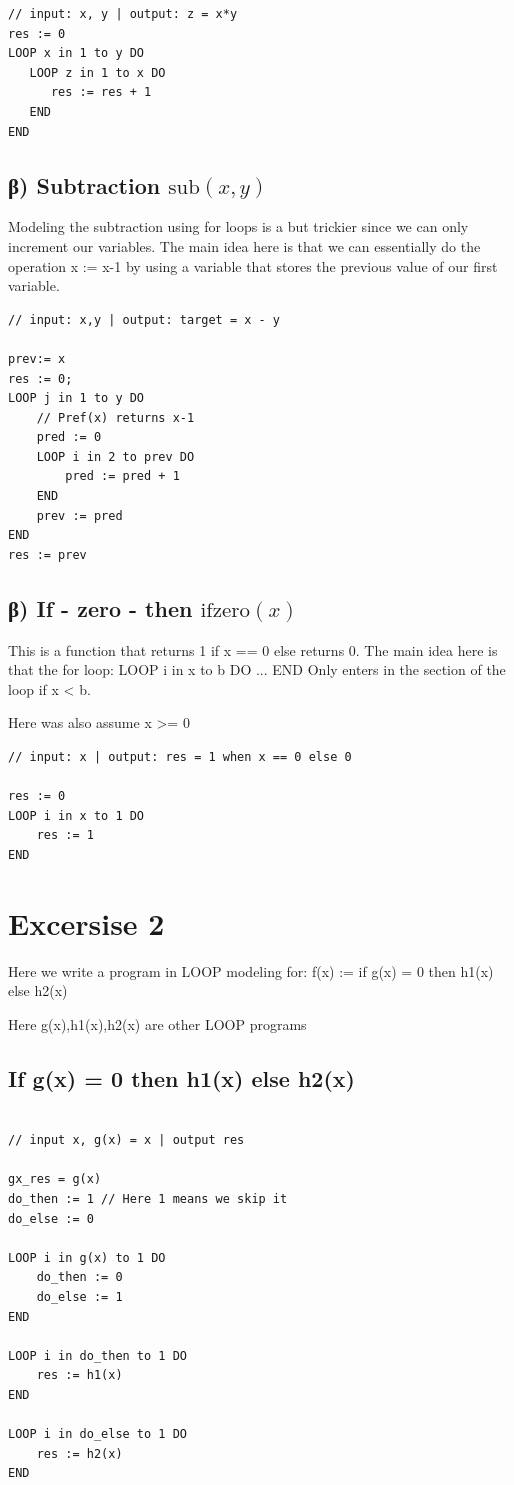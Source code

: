 \documentclass[11pt,a4paper]{article}
\begin{document}
\begin{lstlisting}
// input: x, y | output: z = x*y
res := 0
LOOP x in 1 to y DO
   LOOP z in 1 to x DO
      res := res + 1
   END
END
\end{lstlisting}

\subsection*{β)  Subtraction $\text{sub}(x,y)$}
Modeling the subtraction using for loops is a but trickier since we can only increment our variables. 
The main idea here is that we can essentially do the operation x := x-1 by using a variable that stores the previous value of our first variable.

\begin{lstlisting}
// input: x,y | output: target = x - y

prev:= x
res := 0;
LOOP j in 1 to y DO
    // Pref(x) returns x-1
    pred := 0
    LOOP i in 2 to prev DO
        pred := pred + 1
    END
    prev := pred
END
res := prev

\end{lstlisting}

\subsection*{β) If - zero - then $\text{ifzero}(x)$}
This is a function that returns 1 if x == 0 else returns 0.
The main idea here is that the for loop: 
    LOOP i in x to b DO
        ...
    END
Only enters in the section of the loop if  x < b.

Here was also assume x >= 0  

\begin{lstlisting}
// input: x | output: res = 1 when x == 0 else 0 

res := 0
LOOP i in x to 1 DO
    res := 1
END

\end{lstlisting}

\section*{Excersise 2}
Here we write a program in LOOP modeling for:
f(x) := if g(x) = 0 then h1(x) else h2(x)

Here g(x),h1(x),h2(x) are other LOOP programs

\subsection*{If g(x) = 0 then h1(x) else h2(x)}
\begin{lstlisting}

// input x, g(x) = x | output res

gx_res = g(x)
do_then := 1 // Here 1 means we skip it
do_else := 0

LOOP i in g(x) to 1 DO
    do_then := 0
    do_else := 1
END

LOOP i in do_then to 1 DO
    res := h1(x)
END

LOOP i in do_else to 1 DO
    res := h2(x)
END
\end{lstlisting}
\end{document}

